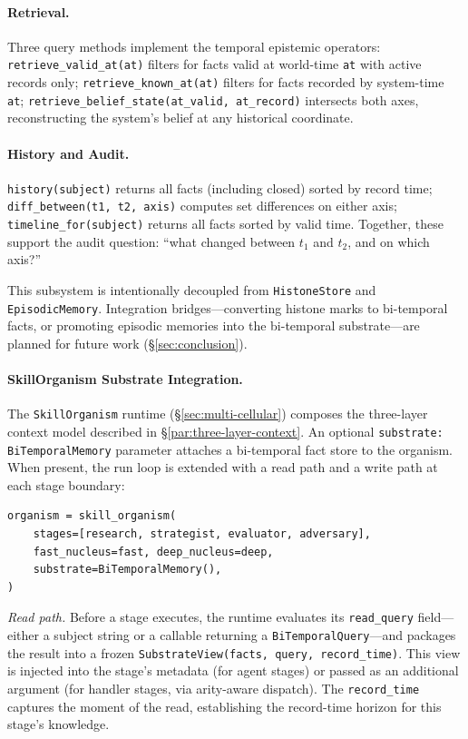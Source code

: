 \paragraph{Retrieval.}
Three query methods implement the temporal epistemic operators: \texttt{retrieve\_valid\_at(at)} filters for facts valid at world-time \texttt{at} with active records only; \texttt{retrieve\_known\_at(at)} filters for facts recorded by system-time \texttt{at}; \texttt{retrieve\_belief\_state}\allowbreak\texttt{(at\_valid, at\_record)} intersects both axes, reconstructing the system's belief at any historical coordinate.

\paragraph{History and Audit.}
\texttt{history(subject)} returns all facts (including closed) sorted by record time; \texttt{diff\_between}\allowbreak\texttt{(t1, t2, axis)} computes set differences on either axis; \texttt{timeline\_for(subject)} returns all facts sorted by valid time. Together, these support the audit question: ``what changed between $t_1$ and $t_2$, and on which axis?''

This subsystem is intentionally decoupled from \texttt{HistoneStore} and \texttt{EpisodicMemory}. Integration bridges---converting histone marks to bi-temporal facts, or promoting episodic memories into the bi-temporal substrate---are planned for future work (\S\ref{sec:conclusion}).

\paragraph{SkillOrganism Substrate Integration.}
\label{sec:substrate-integration}
The \texttt{SkillOrganism} runtime (\S\ref{sec:multi-cellular}) composes the three-layer context model described in \S\ref{par:three-layer-context}. An optional \texttt{substrate: BiTemporalMemory} parameter attaches a bi-temporal fact store to the organism. When present, the run loop is extended with a read path and a write path at each stage boundary:

\begin{verbatim}
organism = skill_organism(
    stages=[research, strategist, evaluator, adversary],
    fast_nucleus=fast, deep_nucleus=deep,
    substrate=BiTemporalMemory(),
)
\end{verbatim}

\noindent\textit{Read path.}
Before a stage executes, the runtime evaluates its \texttt{read\_query} field---either a subject string or a callable returning a \texttt{BiTemporalQuery}---and packages the result into a frozen \texttt{SubstrateView(facts, query, record\_time)}. This view is injected into the stage's metadata (for agent stages) or passed as an additional argument (for handler stages, via arity-aware dispatch). The \texttt{record\_time} captures the moment of the read, establishing the record-time horizon for this stage's knowledge.

